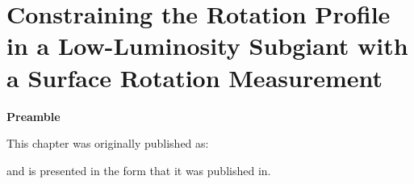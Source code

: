 
\chapter{Constraining the Rotation Profile in a Low-Luminosity Subgiant with a Surface Rotation Measurement}
\label{chap:subgiant_ast}



\textbf{Preamble}

This chapter was originally published as:
\begin{quote}
	\citet{tanner_ast}
\end{quote}
and is presented in the form that it was published in.


\newpage






